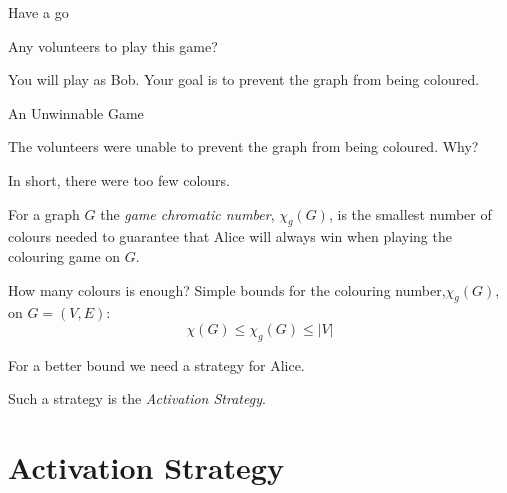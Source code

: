 \documentclass{beamer}
\begin{document}
\begin{frame}{\secname}{Have a go}
    
    
    Any volunteers to play this game?
    
    \bigskip
    
    You will play as Bob. Your goal is to prevent the graph from being coloured.
    
\end{frame}


\begin{frame}{\secname}{An Unwinnable Game}
    
    
    The volunteers were unable to prevent the graph from being coloured. Why?
    
    \bigskip
    
    In short, there were too few colours.
    
    
    \bigskip
    \pause
    
    \begin{definition}
        For a graph $G$ the \textit{game chromatic number}, $\chi_g(G)$, is the smallest number of colours needed to guarantee that Alice will always win when playing the colouring game on $G$.
    \end{definition}
   
\end{frame}

\begin{frame}{\secname}{How many colours is enough?}
    Simple bounds for the colouring number,$\chi_g(G)$, on $G=(V,E)$:
    \[\chi(G) \leq \chi_g(G) \leq |V|\]
    
    \bigskip
    
    For a better bound we need a strategy for Alice.
    
    \bigskip
    \pause
    
    Such a strategy is the \textit{Activation Strategy}.
\end{frame}


\section{Activation Strategy}
\end{document}
